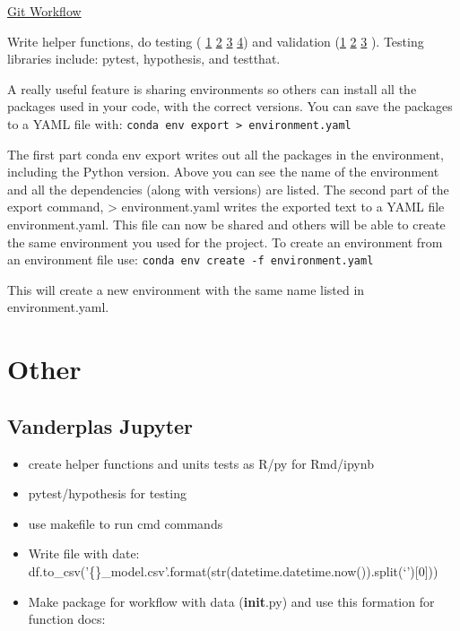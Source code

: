 \documentclass[]{book}
\theoremstyle{definition}
\theoremstyle{definition}
\theoremstyle{definition}
\theoremstyle{remark}
\begin{document}
\href{https://blog.osteele.com/2008/05/my-git-workflow/}{Git Workflow}

Write helper functions, do testing (
\href{http://engineering.pivotal.io/post/test-driven-development-for-data-science/}{1}
\textbar{} \href{http://www.tdda.info/}{2} \textbar{}
\href{http://stochasticsolutions.com/}{3} \textbar{}
\href{https://github.com/ericmjl/data-testing-tutorial}{4}) and
validation (\href{https://github.com/data-cleaning/validate}{1}
\textbar{} \href{https://rdrr.io/cran/checkmate/}{2} \textbar{}
\href{https://github.com/shawnbrown/datatest}{3} ). Testing libraries
include: pytest, hypothesis, and testthat.

A really useful feature is sharing environments so others can install
all the packages used in your code, with the correct versions. You can
save the packages to a YAML file with:
\texttt{conda\ env\ export\ \textgreater{}\ environment.yaml}

The first part conda env export writes out all the packages in the
environment, including the Python version. Above you can see the name of
the environment and all the dependencies (along with versions) are
listed. The second part of the export command, \textgreater{}
environment.yaml writes the exported text to a YAML file
environment.yaml. This file can now be shared and others will be able to
create the same environment you used for the project. To create an
environment from an environment file use:
\texttt{conda\ env\ create\ -f\ environment.yaml}

This will create a new environment with the same name listed in
environment.yaml.

\section{Other}\label{other}

\subsection{Vanderplas Jupyter}\label{vanderplas-jupyter}

\begin{itemize}
\item
  create helper functions and units tests as R/py for Rmd/ipynb
\item
  pytest/hypothesis for testing
\item
  use makefile to run cmd commands
\item
  Write file with date:
  df.to\_csv('\{\}\_model.csv'.format(str(datetime.datetime.now()).split(`'){[}0{]}))
\item
  Make package for workflow with data (\textbf{init}.py) and use this
  formation for function docs:
\end{itemize}
\end{document}
